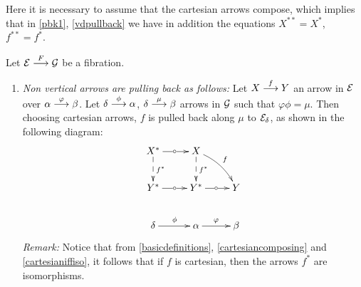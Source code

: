 \begin{comment}
 natural transformation 
 $j_\alpha \circ X^*  \Mr{\eta} j_b \circ X $ as in the following diagram: 
$$
\xymatrix
   {
  & \cc{D} \ar[dl]_{X^*} 
           \ar[dr]^{X} 
  & & &
  \\
    \cc{E}_\alpha \ar[dr]_{j_\alpha}  
                  \ar@{}[rr]|{\overset{\eta}{\implies}} 
 && \cc{E}_\beta \ar[dl]^{j_\beta} 
 &  X_i^*  \ar[r]^{\eta_i} 
 &  X_i
 &  {} 
  \\
 &\cc{E} 
 && \alpha \ar[r]^{\varphi} 
 & \beta
   }
$$
\end{comment}

\begin{sinnadastandard}
\label{pbk2} $ $


Here it is necessary to assume that the cartesian arrows compose, which implies that in \ref{pbk1}, 
\ref{vdpullback} we  have in addition the equations 
$X^{**} = X^*$, $f^{**} = f^*$. 

Let $\mathcal{E} \overset {F} {\longrightarrow} \mathcal{G}$ be a fibration.

\begin{enumerate}

\item \emph{Non vertical arrows are pulling back as follows:}
Let $X \overset {f} {\longrightarrow} Y$ an arrow in 
$\mathcal{E}$ over $\alpha \overset {\varphi} {\longrightarrow} \beta$. Let $\delta \overset {\phi} {\longrightarrow} \alpha$, 
$\delta  \overset {\mu} {\longrightarrow} \beta$ arrows in $\mathcal{G}$ such that  
$\varphi \phi = \mu$. Then choosing cartesian arrows, $f$ is pulled back along $\mu$ to $\mathcal{E}_\delta$, as shown in the following diagram:
%
%
$$
\xymatrix 
    {
     X^* \ar[r]|\car
         \ar@{-->}[d]^{f^*}
   & X \ar@{-->}[d]^{f^*}
       \ar@/^0.5pc/[dr]^f
  \\
     Y^* \ar[r]|\car 
   & Y^* \ar[r]|\car
   & Y 
  \\
     \delta \ar[r]^\phi 
   & \alpha \ar[r]^\varphi
   & \beta
    }
$$
\emph{Remark:} Notice that from \ref{basicdefinitions}, 
\ref{cartesiancomposing} and \ref{cartesianiffiso}, it follows that if $f$ is cartesian, then the arrows $f^*$ are isomorphisms.


\end{enumerate}
\end{sinnadastandard}
